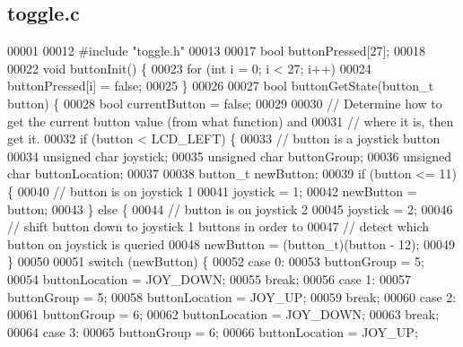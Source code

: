 \subsection{toggle.\+c}
\label{toggle_8c_source}

\begin{DoxyCode}
00001 
00012 \textcolor{preprocessor}{#include "toggle.h"}
00013 
00017 \textcolor{keywordtype}{bool} buttonPressed[27];
00018 
00022 \textcolor{keywordtype}{void} buttonInit() \{
00023   \textcolor{keywordflow}{for} (\textcolor{keywordtype}{int} i = 0; i < 27; i++)
00024     buttonPressed[i] = \textcolor{keyword}{false};
00025 \}
00026 
00027 \textcolor{keywordtype}{bool} buttonGetState(button_t button) \{
00028   \textcolor{keywordtype}{bool} currentButton = \textcolor{keyword}{false};
00029 
00030   \textcolor{comment}{// Determine how to get the current button value (from what function) and}
00031   \textcolor{comment}{// where it is, then get it.}
00032   \textcolor{keywordflow}{if} (button < LCD_LEFT) \{
00033     \textcolor{comment}{// button is a joystick button}
00034     \textcolor{keywordtype}{unsigned} \textcolor{keywordtype}{char} joystick;
00035     \textcolor{keywordtype}{unsigned} \textcolor{keywordtype}{char} buttonGroup;
00036     \textcolor{keywordtype}{unsigned} \textcolor{keywordtype}{char} buttonLocation;
00037 
00038     button_t newButton;
00039     \textcolor{keywordflow}{if} (button <= 11) \{
00040       \textcolor{comment}{// button is on joystick 1}
00041       joystick = 1;
00042       newButton = button;
00043     \} \textcolor{keywordflow}{else} \{
00044       \textcolor{comment}{// button is on joystick 2}
00045       joystick = 2;
00046       \textcolor{comment}{// shift button down to joystick 1 buttons in order to}
00047       \textcolor{comment}{// detect which button on joystick is queried}
00048       newButton = (button_t)(button - 12);
00049     \}
00050 
00051     \textcolor{keywordflow}{switch} (newButton) \{
00052     \textcolor{keywordflow}{case} 0:
00053       buttonGroup = 5;
00054       buttonLocation = JOY\_DOWN;
00055       \textcolor{keywordflow}{break};
00056     \textcolor{keywordflow}{case} 1:
00057       buttonGroup = 5;
00058       buttonLocation = JOY\_UP;
00059       \textcolor{keywordflow}{break};
00060     \textcolor{keywordflow}{case} 2:
00061       buttonGroup = 6;
00062       buttonLocation = JOY\_DOWN;
00063       \textcolor{keywordflow}{break};
00064     \textcolor{keywordflow}{case} 3:
00065       buttonGroup = 6;
00066       buttonLocation = JOY\_UP;

\end{DoxyCode}
